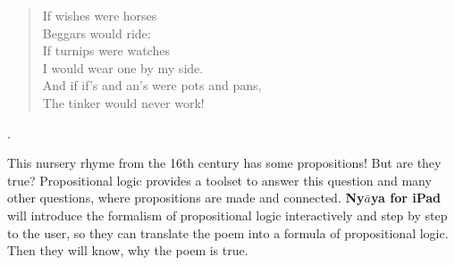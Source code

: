 


\begin{minipage}[t]{180mm}
\begin{verse}
If wishes were horses \\
Beggars would ride: \\
If turnips were watches \\
I would wear one by my side. \\
And if if's and an's were pots and pans, \\
The tinker would never work!
\end{verse}.
\end{minipage}

This nursery rhyme from the 16th century has some propositions! But are they true? 
Propositional logic provides a toolset to answer this question and many other questions,
where propositions are made and connected. {\bf Ny$\bar{a}$ya for iPad} 
will introduce the formalism of propositional logic interactively and step by step to the user, 
so they can translate the poem into a formula of propositional logic. 
Then they will know, why the poem is true.
